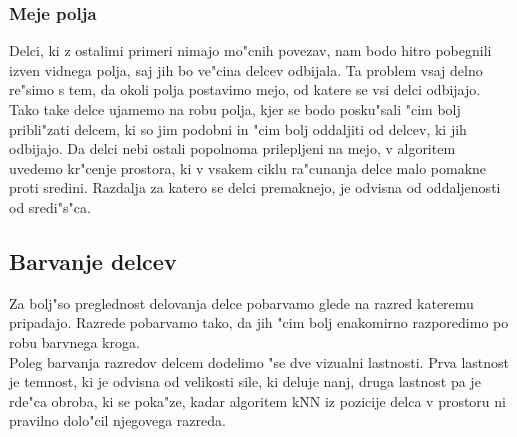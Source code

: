 \documentclass[a4paper]{article}
\begin{document}
		\subsubsection{Meje polja}
			Delci, ki z ostalimi primeri nimajo mo"cnih povezav, nam bodo hitro pobegnili izven vidnega polja, saj jih bo ve"cina delcev odbijala. Ta problem vsaj delno re"simo s tem, da okoli polja postavimo mejo, od katere se vsi delci odbijajo. Tako take delce ujamemo na robu polja, kjer se bodo posku"sali "cim bolj pribli"zati delcem, ki so jim podobni in "cim bolj oddaljiti od delcev, ki jih odbijajo. Da delci nebi ostali popolnoma prilepljeni na mejo, v algoritem uvedemo kr"cenje prostora, ki v vsakem ciklu ra"cunanja delce malo pomakne proti sredini. Razdalja za katero se delci premaknejo, je odvisna od oddaljenosti od sredi"s"ca.
	
	\subsection{Barvanje delcev}
		Za bolj"so preglednost delovanja delce pobarvamo glede na razred kateremu pripadajo. Razrede pobarvamo tako, da jih "cim bolj enakomirno razporedimo po robu barvnega kroga. \\
		Poleg barvanja razredov delcem dodelimo "se dve vizualni lastnosti. Prva lastnost je temnost, ki je odvisna od velikosti sile, ki deluje nanj, druga lastnost pa je rde"ca obroba, ki se poka"ze, kadar algoritem kNN iz pozicije delca v prostoru ni pravilno dolo"cil njegovega razreda.
\end{document}
